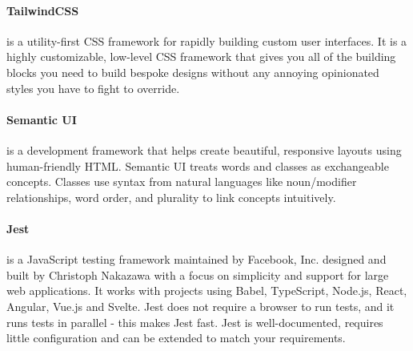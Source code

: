 \paragraph{TailwindCSS} is a utility-first CSS framework for rapidly building custom user interfaces.
It is a highly customizable, low-level CSS framework that gives you all of the building blocks you need to build bespoke designs without any annoying opinionated styles you have to fight to override.


\paragraph{Semantic UI} is a development framework that helps create beautiful, responsive layouts using human-friendly HTML.
Semantic UI treats words and classes as exchangeable concepts.
Classes use syntax from natural languages like noun/modifier relationships, word order, and plurality to link concepts intuitively.


\paragraph{Jest} is a JavaScript testing framework maintained by Facebook, Inc.
designed and built by Christoph Nakazawa with a focus on simplicity and support for large web applications.
It works with projects using Babel, TypeScript, Node.js, React, Angular, Vue.js and Svelte.
Jest does not require a browser to run tests, and it runs tests in parallel - this makes Jest fast.
Jest is well-documented, requires little configuration and can be extended to match your requirements.
